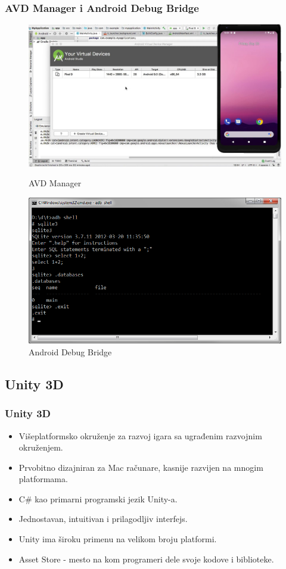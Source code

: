 \documentclass{beamer}
\begin{document}
\begin{frame}
    \frametitle{AVD Manager i Android Debug Bridge}

\begin{figure}
    \centering
    \begin{minipage}{.5\textwidth}
    \centering
    \includegraphics[width=0.9\linewidth]{avd_manager.jpg}
    \caption{AVD Manager}
    \end{minipage}%
    \begin{minipage}{.5\textwidth}
    \centering
    \includegraphics[width=0.8\linewidth]{adb.png}
    \caption{Android Debug Bridge}
    \end{minipage}
\end{figure}

\end{frame}

\begin{frame}
    \section{Unity 3D}
    \frametitle{Unity 3D} 
    \begin{itemize}
	\item Višeplatformsko okruženje za razvoj igara sa ugrađenim razvojnim okruženjem. 
        \item Prvobitno dizajniran za Mac računare, kasnije razvijen na mnogim platformama. 
	\item C# kao primarni programski jezik Unity-a.
	\item Jednostavan, intuitivan i prilagodljiv interfejs.
        \item Unity ima široku primenu na velikom broju platformi.
	\item Asset Store - mesto na kom programeri dele svoje kodove i biblioteke. 
   \end{itemize}
\end{frame}
\end{document}
